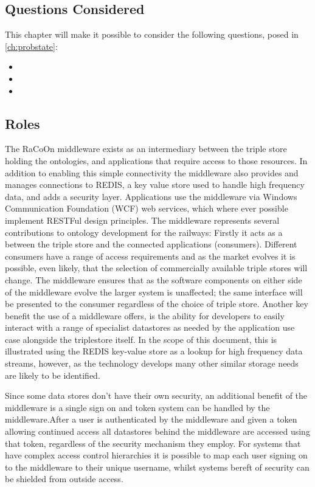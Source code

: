 \subsection{Questions Considered}

This chapter will make it possible to consider the following questions, posed in \autoref{ch:probstate}:
\begin{itemize}
\item \QuestionCombine
\item \QuestionChange
\item \QuestionSkillz
\end{itemize}

\subsection{Roles}
The RaCoOn middleware exists as an intermediary between the triple store holding the ontologies, and applications that require access to those resources. In addition to enabling this simple connectivity the middleware also provides and manages connections to REDIS, a key value store used to handle high frequency data, and adds a security layer. Applications use the middleware via Windows Communication Foundation (WCF) web services, which where ever possible implement RESTFul design principles. The middleware represents several contributions to ontology development for the railways: Firstly it acts as a  between the triple store and the connected applications (consumers). Different consumers have a range of access requirements and as the market evolves it is possible, even likely, that the selection of commercially available triple stores will change. The middleware ensures that as the software components on either side of the middleware evolve the larger system is unaffected; the same interface will be presented to the consumer regardless of the choice of triple store. Another key benefit the use of a middleware offers, is the ability for developers to easily interact with a range of specialist datastores as needed by the application use case alongside the triplestore itself. In the scope of this document, this is illustrated using the REDIS key-value store as a lookup for high frequency data streams, however, as the technology develops many other similar storage needs are likely to be identified.

Since some data stores don't have their own security, an additional benefit of the middleware is a single sign on and token system can be handled by the middleware.After a user is authenticated by the middleware and given a token allowing continued access all datastores behind the middleware are accessed using that token, regardless of the security mechanism they employ. For systems that have complex access control hierarchies it is possible to map each user signing on to the middleware to their unique username, whilst systems bereft of security can be shielded from outside access. 


